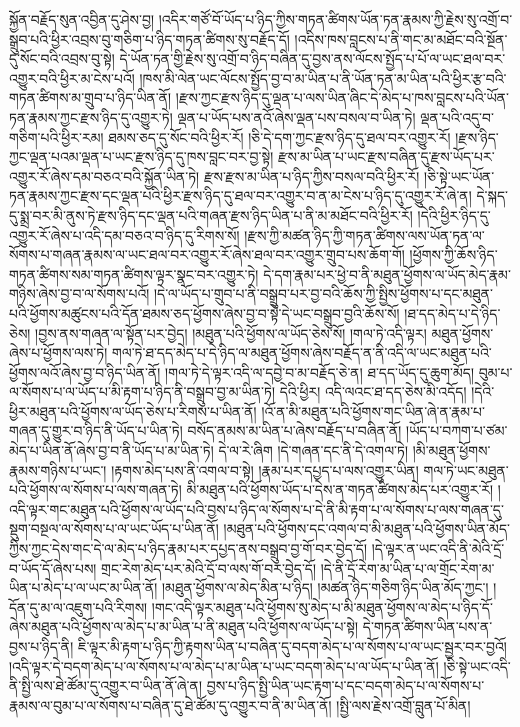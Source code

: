 སྐྱོན་བརྗོད་སུན་འབྱིན་དུ་ཤེས་བྱ། །འདིར་གཙོ་བོ་ཡོད་པ་ཉིད་ཀྱིས་གཏན་ཚིགས་ཡོན་ཏན་རྣམས་ཀྱི་རྗེས་སུ་འགྲོ་བ་སྒྲུབ་པའི་ཕྱིར་འབྲས་བུ་གཅིག་པ་ཉིད་གཏན་ཚིགས་སུ་བརྗོད་དོ། །འདིས་ཁས་བླངས་པ་ནི་གང་མ་མཐོང་བའི་སྔོན་དུ་སོང་བའི་འབྲས་བུ་སྟེ། དེ་ཡོན་ཏན་གྱི་རྗེས་སུ་འགྲོ་བ་ཉིད་བཞིན་དུ་བྱས་ནས་ལོངས་སྤྱོད་པ་པོ་ལ་ཡང་ཐལ་བར་འགྱུར་བའི་ཕྱིར་མ་ངེས་པའོ། །ཁས་མི་ལེན་ཡང་ལོངས་སྤྱོད་བྱ་བ་མ་ཡིན་པ་ནི་ཡོན་ཏན་མ་ཡིན་པའི་ཕྱིར་རྩ་བའི་གཏན་ཚིགས་མ་གྲུབ་པ་ཉིད་ཡིན་ནོ། །རྫས་ཀྱང་རྫས་ཉིད་དུ་ལྡན་པ་ལས་ཡིན་ཞིང་དེ་མེད་པ་ཁས་བླངས་པའི་ཡོན་ཏན་རྣམས་ཀྱང་རྫས་ཉིད་དུ་འགྱུར་ཏེ། ལྡན་པ་ཡོད་པས་ནའོ་ཞེས་ལྡན་པས་བསལ་བ་ཡིན་ཏེ། ལྡན་པའི་འདུ་བ་གཅིག་པའི་ཕྱིར་རམ། ཐམས་ཅད་དུ་སོང་བའི་ཕྱིར་རོ། །ཅི་དེ་དག་ཀྱང་རྫས་ཉིད་དུ་ཐལ་བར་འགྱུར་རོ། །རྫས་ཉིད་ཀྱང་ལྡན་པའམ་ལྡན་པ་ཡང་རྫས་ཉིད་དུ་ཁས་བླང་བར་བྱ་སྟེ། རྫས་མ་ཡིན་པ་ཡང་རྫས་བཞིན་དུ་རྫས་ཡོད་པར་འགྱུར་རོ་ཞེས་དམ་བཅའ་བའི་སྐྱོན་ཡིན་ཏེ། རྫས་རྫས་མ་ཡིན་པ་ཉིད་ཀྱིས་བསལ་བའི་ཕྱིར་རོ། །ཅི་སྟེ་ཡང་ཡོན་ཏན་རྣམས་ཀྱང་རྫས་དང་ལྡན་པའི་ཕྱིར་རྫས་ཉིད་དུ་ཐལ་བར་འགྱུར་བ་ན་མ་ངེས་པ་ཉིད་དུ་འགྱུར་རོ་ཞེ་ན། དེ་སྐད་དུ་སྨྲ་བར་མི་ནུས་ཏེ་རྫས་ཉིད་དང་ལྡན་པའི་གཞན་རྫས་ཉིད་ཡིན་པ་ནི་མ་མཐོང་བའི་ཕྱིར་རོ། །དེའི་ཕྱིར་ཉིད་དུ་འགྱུར་རོ་ཞེས་པ་འདི་དམ་བཅའ་བ་ཉིད་དུ་རིགས་སོ། །རྫས་ཀྱི་མཚན་ཉིད་ཀྱི་གཏན་ཚིགས་ལས་ཡོན་ཏན་ལ་སོགས་པ་གཞན་རྣམས་ལ་ཡང་ཐལ་བར་འགྱུར་རོ་ཞེས་ཐལ་བར་འགྱུར་གྲུབ་པས་ཆོག་གོ། །ཕྱོགས་ཀྱི་ཆོས་ཉིད་གཏན་ཚིགས་སམ་གཏན་ཚིགས་ལྟར་སྣང་བར་འགྱུར་ཏེ། དེ་དག་རྣམ་པར་ཕྱེ་བ་ནི་མཐུན་ཕྱོགས་ལ་ཡོད་མེད་རྣམ་གཉིས་ཞེས་བྱ་བ་ལ་སོགས་པའོ། །དེ་ལ་ཡོད་པ་གྲུབ་པ་ནི་བསྒྲུབ་པར་བྱ་བའི་ཆོས་ཀྱི་སྤྱིས་ཕྱོགས་པ་དང་མཐུན་པའི་ཕྱོགས་མཚུངས་པའི་དོན་ཐམས་ཅད་ཕྱོགས་ཞེས་བྱ་བ་སྟེ་དེ་ཡང་བསྒྲུབ་བྱའི་ཆོས་སོ། །ཐ་དད་མེད་པ་དེ་ཉིད་ཅེས། །བྱས་ནས་གཞན་ལ་སྟོན་པར་བྱེད། །མཐུན་པའི་ཕྱོགས་ལ་ཡོད་ཅེས་སོ། །གལ་ཏེ་འདི་ལྟར། མཐུན་ཕྱོགས་ཞེས་པ་ཕྱོགས་ལས་ཏེ། གལ་ཏེ་ཐ་དད་མེད་པ་དེ་ཉིད་ལ་མཐུན་ཕྱོགས་ཞེས་བརྗོད་ན་ནི་འདི་ལ་ཡང་མཐུན་པའི་ཕྱོགས་ལའོ་ཞེས་བྱ་བ་ཉིད་ཡིན་ནོ། །གལ་ཏེ་དེ་ལྟར་འདི་ལ་དབྱེ་བ་མ་བརྗོད་ཅེ་ན། ཐ་དད་ཡོད་དུ་ཆུག་མོད། བུམ་པ་ལ་སོགས་པ་ལ་ཡོད་པ་མི་རྟག་པ་ཉིད་ནི་བསྒྲུབ་བྱ་མ་ཡིན་ཏེ། དེའི་ཕྱིར། འདི་ལའང་ཐ་དད་ཅེས་མི་འདོད། །དེའི་ཕྱིར་མཐུན་པའི་ཕྱོགས་ལ་ཡོད་ཅེས་པ་རིགས་པ་ཡིན་ནོ། །འོ་ན་མི་མཐུན་པའི་ཕྱོགས་གང་ཡིན་ཞེ་ན་རྣམ་པ་གཞན་དུ་གྱུར་བ་ཉིད་ནི་ཡོད་པ་ཡིན་ཏེ། བསོད་ནམས་མ་ཡིན་པ་ཞེས་བརྗོད་པ་བཞིན་ནོ། །ཡོད་པ་བཀག་པ་ཙམ་མེད་པ་ཡིན་ནོ་ཞེས་བྱ་བ་ནི་ཡོད་པ་མ་ཡིན་ཏེ། དེ་ལ་རེ་ཞིག །དེ་གཞན་དང་ནི་དེ་འགལ་ཏེ། །མི་མཐུན་ཕྱོགས་རྣམས་གཉིས་པ་ཡང་། །རྟགས་མེད་པས་ནི་འགལ་བ་སྟེ། །རྣམ་པར་དཔྱད་པ་ལས་འགྱུར་ཡིན། གལ་ཏེ་ཡང་མཐུན་པའི་ཕྱོགས་ལ་སོགས་པ་ལས་གཞན་ཏེ། མི་མཐུན་པའི་ཕྱོགས་ཡོད་པ་དེས་ན་གཏན་ཚིགས་མེད་པར་འགྱུར་རོ། །འདི་ལྟར་གང་མཐུན་པའི་ཕྱོགས་ལ་ཡོད་པའི་བྱས་པ་ཉིད་ལ་སོགས་པ་དེ་ནི་མི་རྟག་པ་ལ་སོགས་པ་ལས་གཞན་དུ་སྡུག་བསྔལ་ལ་སོགས་པ་ལ་ཡང་ཡོད་པ་ཡིན་ནོ། །མཐུན་པའི་ཕྱོགས་དང་འགལ་བ་མི་མཐུན་པའི་ཕྱོགས་ཡིན་མོད་ཀྱིས་ཀྱང་དེས་གང་དེ་ལ་མེད་པ་ཉིད་རྣམ་པར་དཔྱད་ནས་བསྒྲུབ་བྱ་གོ་བར་བྱེད་དོ། །དེ་ལྟར་ན་ཡང་འདི་ནི་མེའི་དྲོ་བ་ཡོད་དོ་ཞེས་པས། གྲང་རེག་མེད་པར་མེའི་དྲོ་བ་ལས་གོ་བར་བྱེད་དོ། །དེ་ནི་དྲོ་རེག་མ་ཡིན་པ་ལ་གྲོང་རེག་མ་ཡིན་པ་མེད་པ་ལ་ཡང་མ་ཡིན་ནོ། །མཐུན་ཕྱོགས་ལ་མེད་མིན་པ་ཉིད། །མཚན་ཉིད་གཅིག་ཉིད་ཡིན་མོད་ཀྱང་། །དོན་དུ་མ་ལ་འཇུག་པའི་རིགས། །གང་འདི་ལྟར་མཐུན་པའི་ཕྱོགས་སུ་མེད་པ་མི་མཐུན་ཕྱོགས་ལ་མེད་པ་ཉིད་དོ་ཞེས་མཐུན་པའི་ཕྱོགས་ལ་མེད་པ་མ་ཡིན་པ་ནི་མཐུན་པའི་ཕྱོགས་ལ་ཡོད་པ་སྟེ། དེ་གཏན་ཚིགས་ཡིན་པས་ན་བྱས་པ་ཉིད་ནི། ཇི་ལྟར་མི་རྟག་པ་ཉིད་ཀྱི་རྟགས་ཡིན་པ་བཞིན་དུ་བདག་མེད་པ་ལ་སོགས་པ་ལ་ཡང་སྦྱར་བར་བྱའོ། །འདི་ལྟར་དེ་བདག་མེད་པ་ལ་སོགས་པ་ལ་མེད་པ་མ་ཡིན་པ་ཡང་བདག་མེད་པ་ལ་ཡོད་པ་ཡིན་ནོ། །ཅི་སྟེ་ཡང་འདི་ནི་སྤྱི་ལས་ཐེ་ཚོམ་དུ་འགྱུར་བ་ཡིན་ནོ་ཞེ་ན། བྱས་པ་ཉིད་སྤྱི་ཡིན་ཡང་རྟག་པ་དང་བདག་མེད་པ་ལ་སོགས་པ་རྣམས་ལ་བུམ་པ་ལ་སོགས་པ་བཞིན་དུ་ཐེ་ཚོམ་དུ་འགྱུར་བ་ནི་མ་ཡིན་ནོ། །སྤྱི་ལས་རྗེས་འགྲོ་བླུན་པོ་མིན། 